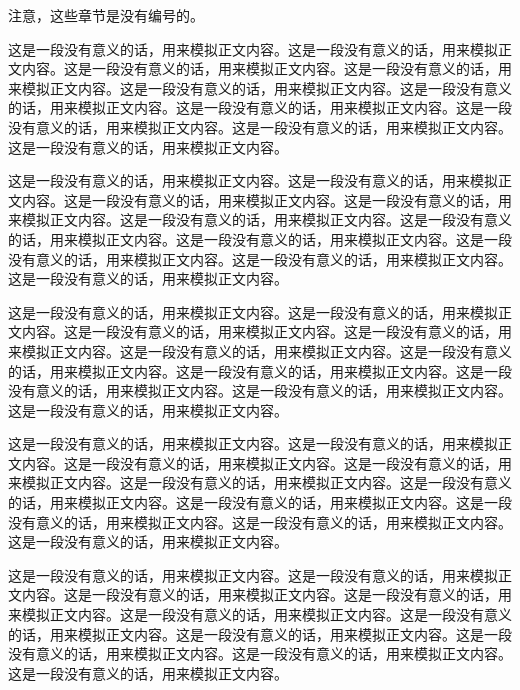 
注意，这些章节是没有编号的。

这是一段没有意义的话，用来模拟正文内容。这是一段没有意义的话，用来模拟正文内容。这是一段没有意义的话，用来模拟正文内容。这是一段没有意义的话，用来模拟正文内容。这是一段没有意义的话，用来模拟正文内容。这是一段没有意义的话，用来模拟正文内容。这是一段没有意义的话，用来模拟正文内容。这是一段没有意义的话，用来模拟正文内容。这是一段没有意义的话，用来模拟正文内容。这是一段没有意义的话，用来模拟正文内容。


这是一段没有意义的话，用来模拟正文内容。这是一段没有意义的话，用来模拟正文内容。这是一段没有意义的话，用来模拟正文内容。这是一段没有意义的话，用来模拟正文内容。这是一段没有意义的话，用来模拟正文内容。这是一段没有意义的话，用来模拟正文内容。这是一段没有意义的话，用来模拟正文内容。这是一段没有意义的话，用来模拟正文内容。这是一段没有意义的话，用来模拟正文内容。这是一段没有意义的话，用来模拟正文内容。


这是一段没有意义的话，用来模拟正文内容。这是一段没有意义的话，用来模拟正文内容。这是一段没有意义的话，用来模拟正文内容。这是一段没有意义的话，用来模拟正文内容。这是一段没有意义的话，用来模拟正文内容。这是一段没有意义的话，用来模拟正文内容。这是一段没有意义的话，用来模拟正文内容。这是一段没有意义的话，用来模拟正文内容。这是一段没有意义的话，用来模拟正文内容。这是一段没有意义的话，用来模拟正文内容。


这是一段没有意义的话，用来模拟正文内容。这是一段没有意义的话，用来模拟正文内容。这是一段没有意义的话，用来模拟正文内容。这是一段没有意义的话，用来模拟正文内容。这是一段没有意义的话，用来模拟正文内容。这是一段没有意义的话，用来模拟正文内容。这是一段没有意义的话，用来模拟正文内容。这是一段没有意义的话，用来模拟正文内容。这是一段没有意义的话，用来模拟正文内容。这是一段没有意义的话，用来模拟正文内容。


这是一段没有意义的话，用来模拟正文内容。这是一段没有意义的话，用来模拟正文内容。这是一段没有意义的话，用来模拟正文内容。这是一段没有意义的话，用来模拟正文内容。这是一段没有意义的话，用来模拟正文内容。这是一段没有意义的话，用来模拟正文内容。这是一段没有意义的话，用来模拟正文内容。这是一段没有意义的话，用来模拟正文内容。这是一段没有意义的话，用来模拟正文内容。这是一段没有意义的话，用来模拟正文内容。

